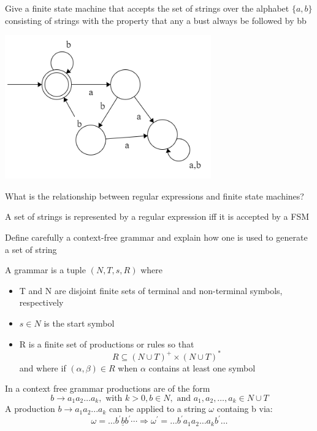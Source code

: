 \documentclass{exam}
\begin{document}
\begin{questions}
\question[7]Give a finite state machine that accepts the set of strings over the alphabet $\{a,b\}$ consisting of strings with the property that any a bust always be followed by bb
\begin{solution}[2in]
	\begin{center}
		\includegraphics[scale=0.7]{Q19}
	\end{center}
	
\end{solution}

\question[2]What is the relationship between regular expressions and finite state machines?
\begin{solution}[2in]
	A set of strings is represented by a regular expression iff it is accepted by a FSM
\end{solution}

\question[10]Define carefully a context-free grammar and explain how one is used to generate a set of string
\begin{solution}[2in]
	A grammar is a tuple $(N,T,s,R)$ where
	\begin{itemize}
		\item T and N are disjoint finite sets of terminal and non-terminal symbols, respectively
		\item $s\in N$ is the start symbol
		\item R is a finite set of productions or rules so that
		\[
		R \subseteq(N \cup T)^{+} \times(N \cup T)^{*}
		\]
		and where if $(\alpha,\beta)\in R$ when $\alpha$ contains at least one symbol\\
	\end{itemize}
		In a context free grammar productions are of the form
		\[
		b \rightarrow a_{1} a_{2} \ldots a_{k}, \text { with } k>0, b \in N, \text { and } a_{1}, a_{2}, \ldots, a_{k} \in N \cup T
		\]
	A production $b\rightarrow a_1a_2...a_k$ can be applied to a string $\omega$ containg b via:
	\[
	\omega=\ldots b^{\prime} \underline{b} b^{\prime} \cdots \Rightarrow \omega^{\prime}=\ldots b^{\prime} a_{1} a_{2} \dots a_{k} b^{\prime} \ldots
	\]
	

\end{solution}
\end{questions}
\end{document}
